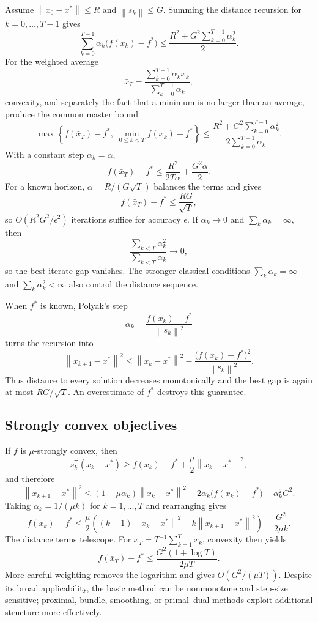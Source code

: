\documentclass[12pt,oneside]{book}
\numberwithin{equation}{section}
\theoremstyle{definition}
\theoremstyle{plain}
\theoremstyle{remark}
\newcommand{\norm}[1]{\left\lVert #1 \right\rVert}
\begin{document}
Assume $\norm{x_0-x^*}\leq R$ and $\norm{s_k}\leq G$. Summing the distance
recursion for $k=0,\ldots,T-1$ gives
\[
 \sum_{k=0}^{T-1}\alpha_k\bigl(f(x_k)-f^*\bigr)
 \leq\frac{R^2+G^2\sum_{k=0}^{T-1}\alpha_k^2}{2}.
\]
For the weighted average
\[
 \bar x_T=\frac{\sum_{k=0}^{T-1}\alpha_kx_k}
                  {\sum_{k=0}^{T-1}\alpha_k},
\]
convexity, and separately the fact that a minimum is no larger than an
average, produce the common master bound
\begin{equation}\label{eq:subgradient-master}
 \max\!\left\{f(\bar x_T)-f^*,\;
 \min_{0\leq k<T}f(x_k)-f^*\right\}
 \leq\frac{R^2+G^2\sum_{k=0}^{T-1}\alpha_k^2}
           {2\sum_{k=0}^{T-1}\alpha_k}.
\end{equation}
With a constant step $\alpha_k=\alpha$,
\[
 f(\bar x_T)-f^*\leq\frac{R^2}{2T\alpha}+\frac{G^2\alpha}{2}.
\]
For a known horizon, $\alpha=R/(G\sqrt{T})$ balances the terms and gives
\[
 f(\bar x_T)-f^*\leq\frac{RG}{\sqrt{T}},
\]
so $O(R^2G^2/\epsilon^2)$ iterations suffice for accuracy $\epsilon$.
If $\alpha_k\to0$ and $\sum_k\alpha_k=\infty$, then
\[
 \frac{\sum_{k<T}\alpha_k^2}{\sum_{k<T}\alpha_k}\longrightarrow0,
\]
so the best-iterate gap vanishes. The stronger classical conditions
$\sum_k\alpha_k=\infty$ and $\sum_k\alpha_k^2<\infty$ also control the
distance sequence.

When $f^*$ is known, Polyak's step
\[
 \alpha_k=\frac{f(x_k)-f^*}{\norm{s_k}^2}
\]
turns the recursion into
\[
 \norm{x_{k+1}-x^*}^2
 \leq\norm{x_k-x^*}^2
 -\frac{\bigl(f(x_k)-f^*\bigr)^2}{\norm{s_k}^2}.
\]
Thus distance to every solution decreases monotonically and the best gap is
again at most $RG/\sqrt{T}$. An overestimate of $f^*$ destroys this guarantee.

\subsection{Strongly convex objectives}

If $f$ is $\mu$-strongly convex, then
\[
 s_k^\mathsf T(x_k-x^*)\geq f(x_k)-f^*
             +\frac{\mu}{2}\norm{x_k-x^*}^2,
\]
and therefore
\[
 \norm{x_{k+1}-x^*}^2
 \leq(1-\mu\alpha_k)\norm{x_k-x^*}^2
 -2\alpha_k\bigl(f(x_k)-f^*\bigr)+\alpha_k^2G^2.
\]
Taking $\alpha_k=1/(\mu k)$ for $k=1,\ldots,T$ and rearranging gives
\[
 f(x_k)-f^*\leq\frac{\mu}{2}
 \left((k-1)\norm{x_k-x^*}^2-k\norm{x_{k+1}-x^*}^2\right)
 +\frac{G^2}{2\mu k}.
\]
The distance terms telescope. For
$\bar x_T=T^{-1}\sum_{k=1}^T x_k$, convexity then yields
\[
 f(\bar x_T)-f^*\leq\frac{G^2(1+\log T)}{2\mu T}.
\]
More careful weighting removes the logarithm and gives
$O(G^2/(\mu T))$. Despite its broad applicability, the basic method can be
nonmonotone and step-size sensitive; proximal, bundle, smoothing, or
primal--dual methods exploit additional structure more effectively.
\end{document}
